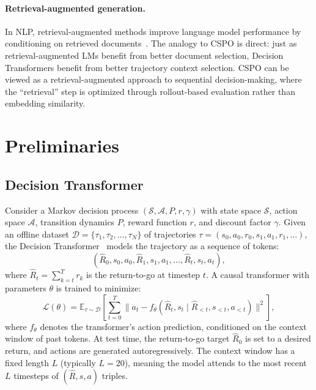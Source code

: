 \documentclass{article}
\newcommand{\cspo}{\textsc{CSPO}}
\newcommand{\EE}{\mathbb{E}}
\newcommand{\cD}{\mathcal{D}}
\newcommand{\cL}{\mathcal{L}}
\newcommand{\cS}{\mathcal{S}}
\newcommand{\cA}{\mathcal{A}}
\begin{document}
\paragraph{Retrieval-augmented generation.}
In NLP, retrieval-augmented methods improve language model performance by conditioning on retrieved documents~\citep{borgeaud2022improving, ram2023incontext}. The analogy to \cspo{} is direct: just as retrieval-augmented LMs benefit from better document selection, Decision Transformers benefit from better trajectory context selection. \cspo{} can be viewed as a retrieval-augmented approach to sequential decision-making, where the ``retrieval'' step is optimized through rollout-based evaluation rather than embedding similarity.


\section{Preliminaries}
\label{sec:prelim}

\subsection{Decision Transformer}
\label{sec:prelim_dt}

Consider a Markov decision process $(\cS, \cA, P, r, \gamma)$ with state space $\cS$, action space $\cA$, transition dynamics $P$, reward function $r$, and discount factor $\gamma$. Given an offline dataset $\cD = \{\tau_1, \tau_2, \ldots, \tau_N\}$ of trajectories $\tau = (s_0, a_0, r_0, s_1, a_1, r_1, \ldots)$, the Decision Transformer~\citep{chen2021decision} models the trajectory as a sequence of tokens:
\begin{equation}
    \label{eq:dt_sequence}
    (\hat{R}_0, s_0, a_0, \hat{R}_1, s_1, a_1, \ldots, \hat{R}_t, s_t, a_t),
\end{equation}
where $\hat{R}_t = \sum_{k=t}^{T} r_k$ is the return-to-go at timestep $t$. A causal transformer with parameters $\theta$ is trained to minimize:
\begin{equation}
    \label{eq:dt_loss}
    \cL(\theta) = \EE_{\tau \sim \cD} \left[ \sum_{t=0}^{T} \| a_t - f_\theta(\hat{R}_t, s_t \mid \hat{R}_{<t}, s_{<t}, a_{<t}) \|^2 \right],
\end{equation}
where $f_\theta$ denotes the transformer's action prediction, conditioned on the context window of past tokens. At test time, the return-to-go target $\hat{R}_0$ is set to a desired return, and actions are generated autoregressively. The context window has a fixed length $L$ (typically $L=20$), meaning the model attends to the most recent $L$ timesteps of $(\hat{R}, s, a)$ triples.
\end{document}
